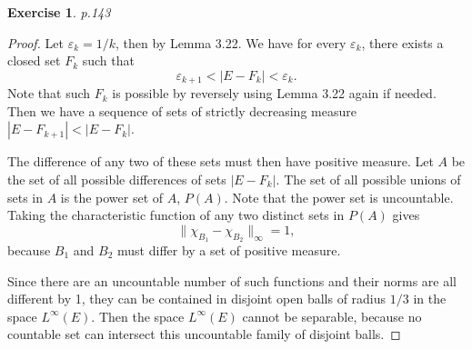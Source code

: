 \documentclass[11pt,a4paper]{article}
\newcommand{\vare}{\varepsilon}
\renewcommand{\(}{\left(}
\renewcommand{\)}{\right)}
\renewcommand{\[}{\left[}
\renewcommand{\]}{\right]}
\newtheorem{exercise}{Exercise}
\begin{document}
  \begin{exercise}
  	p.143
  \end{exercise}
  \begin{proof}
  	Let $\vare_k = 1/k$, then by Lemma 3.22. We have for every $\vare_k$, there exists a closed set $F_k$ such that $$\vare_{k+1}<|E- F_k|<\vare_k.$$ Note that such $F_k$ is possible by reversely using Lemma 3.22 again if needed. Then we have a sequence of sets of strictly decreasing measure $|E-F_{k+1}|<|E-F_k|$. 
  	
  	The difference of any two of these sets must then have positive measure. Let $A$ be the set of all possible differences of sets $|E-F_k|$. The set of all possible unions of sets in $A$ is the power set of $A$, $P(A)$. Note that the power set is uncountable. Taking the characteristic function of any two distinct sets in $P(A)$ gives $$\|\chi_{B_1}-\chi_{B_2}\|_\infty = 1,$$ because $B_1$ and $B_2$ must differ by a set of positive measure. 
  	
  	Since there are an uncountable number of such functions and their norms are all different by 1, they can be contained in disjoint open balls of radius $1/3$ in the space $L^\infty(E)$. Then the space $L^\infty(E)$ cannot be separable, because no countable set can intersect this uncountable family of disjoint balls.
  \end{proof}
\end{document}
